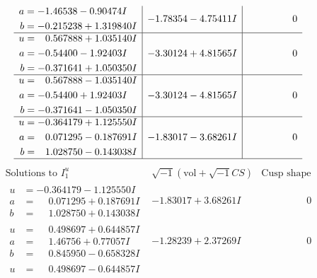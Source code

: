 \documentclass[1p]{elsarticle_modified}
\theoremstyle{definition}
\newcommand{\I}{\sqrt{-1}}
\begin{document}
$$\begin{array}{c|c|c}
\begin{aligned}
a &= -1.46538 - 0.90474 I \\
b &= -0.215238 + 1.319840 I\end{aligned}
 & -1.78354 - 4.75411 I & \phantom{-0.000000 } 0 \\ \hline\begin{aligned}
u &= \phantom{-}0.567888 + 1.035140 I \\
a &= -0.54400 - 1.92403 I \\
b &= -0.371641 + 1.050350 I\end{aligned}
 & -3.30124 + 4.81565 I & \phantom{-0.000000 } 0 \\ \hline\begin{aligned}
u &= \phantom{-}0.567888 - 1.035140 I \\
a &= -0.54400 + 1.92403 I \\
b &= -0.371641 - 1.050350 I\end{aligned}
 & -3.30124 - 4.81565 I & \phantom{-0.000000 } 0 \\ \hline\begin{aligned}
u &= -0.364179 + 1.125550 I \\
a &= \phantom{-}0.071295 - 0.187691 I \\
b &= \phantom{-}1.028750 - 0.143038 I\end{aligned}
 & -1.83017 - 3.68261 I & \phantom{-0.000000 } 0\\
 \hline 
 \end{array}$$\newpage$$\begin{array}{c|c|c}  
\text{Solutions to }I^u_{1}& \I (\text{vol} + \sqrt{-1}CS) & \text{Cusp shape}\\
 \hline 
\begin{aligned}
u &= -0.364179 - 1.125550 I \\
a &= \phantom{-}0.071295 + 0.187691 I \\
b &= \phantom{-}1.028750 + 0.143038 I\end{aligned}
 & -1.83017 + 3.68261 I & \phantom{-0.000000 } 0 \\ \hline\begin{aligned}
u &= \phantom{-}0.498697 + 0.644857 I \\
a &= \phantom{-}1.46756 + 0.77057 I \\
b &= \phantom{-}0.845950 - 0.658328 I\end{aligned}
 & -1.28239 + 2.37269 I & \phantom{-0.000000 } 0 \\ \hline\begin{aligned}
u &= \phantom{-}0.498697 - 0.644857 I \\

\end{aligned}
\end{array}$$
\end{document}
